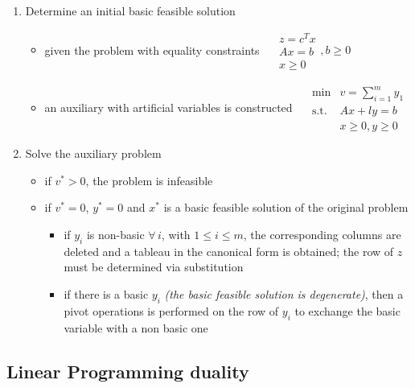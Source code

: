 \documentclass[english]{article}
\begin{document}
\begin{enumerate}[label=Phase \arabic*:, ref=phase \arabic*, leftmargin=*, labelindent=1em, widest*=8]
  \item Determine an initial basic feasible solution
        \begin{itemize}
          \item given the problem with equality constraints
                \(\quad \begin{matrix}
                  z = c^T x \\
                  Ax = b    \\
                  x \geq 0
                \end{matrix}, b \geq 0\)
          \item an auxiliary \LP with artificial variables is constructed
                \(\quad \begin{matrix}
                  \min        & v = \displaystyle \sum_{i=1}^m y_1 \\
                  \text{s.t.} & Ax + ly = b                        \\
                              & x \geq 0, y \geq 0
                \end{matrix}\)
        \end{itemize}
  \item Solve the auxiliary problem
        \begin{itemize}
          \item if \(v^\ast > 0\), the problem is infeasible
          \item if \(v^\ast = 0\), \(y^\ast = 0\) and \(x^\ast\) is a basic feasible solution of the original problem
                \begin{itemize}
                  \item if \(y_i\) is non-basic \(\forall \, i\), with \(1 \leq i \leq m\), the corresponding columns are deleted and a tableau in the canonical form is obtained; the row of \(z\) must be determined via substitution
                  \item if there is a basic \(y_i\) \textit{(the basic feasible solution is degenerate)}, then a pivot operations is performed on the row of \(y_i\) to exchange the basic variable with a non basic one
                \end{itemize}
        \end{itemize}
\end{enumerate}

\subsection{Linear Programming duality}
\end{document}
